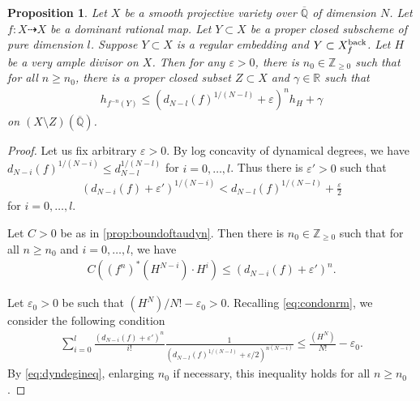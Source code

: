 \documentclass[12pt]{amsart}
\theoremstyle{plain}
\newtheorem{proposition}[theorem]{Proposition}
\theoremstyle{definition}
\numberwithin{equation}{section}
\def\R{{\mathbb R}}
\def\Z{{\mathbb Z}}
\def\QQ{\overline{\mathbb Q}}
\newcommand{\g}{\gamma}
\newcommand{\e}{\varepsilon}
\begin{document}
\begin{proposition}\label{prop:ggcdpullbackbound}
Let $X$ be a smooth projective variety over $\QQ$ of dimension $N$.
Let $f \colon X \dashrightarrow X$ be a dominant rational map.
Let $Y \subset X$ be a proper closed subscheme of pure dimension $l$.
Suppose $Y \subset X$ is a regular embedding and $Y \subset X_{f}^{\rm back}$.
Let $H$ be a very ample divisor on $X$.
Then for any $\e >0$, there is $n_{0} \in \Z_{\geq 0}$
such that for all $n \geq n_{0}$, there is a proper closed subset $Z \subset X$
and $\g \in \R$ such that
\begin{align}
h_{f^{-n}(Y)} \leq (d_{N-l}(f)^{1/(N-l)} + \e)^{n} h_{H} + \g
\end{align}
on $(X\setminus Z)(\QQ) $.
\end{proposition}
\begin{proof}
Let us fix arbitrary $\e>0$.
By log concavity of dynamical degrees, we have 
$d_{N-i}(f)^{1/(N-i)} \leq d_{N-l}^{1/(N-l)}$ for $i = 0,\dots, l$.
Thus there is $\e'>0$ such that
\begin{align}
( d_{N-i}(f)+ \e' )^{1/(N-i)} <  d_{N-l}(f)^{1/(N-l)}+ \frac{\e}{2} \label{eq:dyndegineq}
\end{align}
for $i=0,\dots,l$.

Let $C > 0$ be as in \cref{prop:boundoftaudyn}.
Then there is $n_{0} \in \Z_{\geq 0}$ such that for all $n \geq n_{0}$ and $i=0,\dots,l$, we have
\begin{align}
C ((f^{n})^{*}(H^{N-i}) \cdot H^{i} )  \leq ( d_{N-i}(f)+ \e')^{n}.
\end{align}

Let $\e_{0} > 0$ be such that $(H^{N})/N! - \e_{0} > 0$. 
Recalling  \cref{eq:condonrm}, we consider the following condition
\begin{align}
\sum_{i=0}^{l} \frac{( d_{N-i}(f)+ \e')^{n}}{i!}  \frac{1}{( d_{N-l}(f)^{1/(N-l)}+ \e/2 )^{n(N-i)} } \leq \frac{(H^{N})}{N!} - \e_{0}.
\end{align}
By \cref{eq:dyndegineq},  enlarging $n_{0}$ if necessary, this inequality holds for all $n \geq n_{0}$.


\end{proof}
\end{document}
